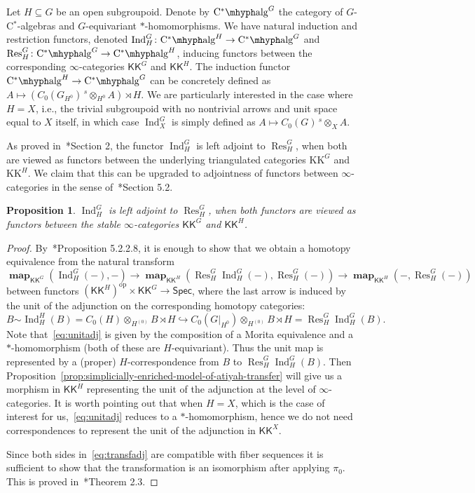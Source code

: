 \documentclass[a4paper,reqno]{amsart}
\theoremstyle{plain}
\newtheorem{proposition}[theorem]{Proposition}
\theoremstyle{definition}
\theoremstyle{remark}
\numberwithin{equation}{section}
\newcommand{\Spec}{\mathsf{Spec}}
\newcommand{\CstAlg}{\mathrm{C}^*\mhyph\mathrm{alg}}
\newcommand{\KK}{\mathrm{KK}}
\newcommand{\icKK}{\mathsf{KK}}
\DeclareMathOperator{\Ind}{Ind}
\DeclareMathOperator{\Res}{Res}
\DeclareMathOperator{\map}{\mathbf{map}}
\begin{document}
Let $H\subseteq G$ be an open subgroupoid. Denote by $\CstAlg^G$ the category of $G$-C$^*$-algebras and $G$-equivariant $\ast$-homomorphisms. We have natural induction and restriction functors, denoted $\Ind_H^G\colon \CstAlg^H\to \CstAlg^G$ and $\Res^G_H\colon \CstAlg^G\to \CstAlg^H$, inducing functors between the corresponding $\infty$-categories $\icKK^G$ and $\icKK^H$. The induction functor $\CstAlg^H\to \CstAlg^G$ can be concretely defined as $A\mapsto (C_0(G_{H^{0}})\,^{s}\!\otimes_{H^{0}} A)\rtimes H$. We are particularly interested in the case where $H=X$, i.e., the trivial subgroupoid with no nontrivial arrows and unit space equal to $X$ itself, in which case $\Ind_X^G$ is simply defined as $A\mapsto C_0(G)\,^{s}\!\otimes_X A$.

As proved in~\cite{val:kthpgrp}*{Section 2}, the functor $\Ind_H^G$ is left adjoint to $\Res^G_H$, when both are viewed as functors between the underlying triangulated categories $\KK^G$ and $\KK^H$.
We claim that this can be upgraded to adjointness of functors between $\infty$-categories in the sense of~\cite{lur:ht}*{Section 5.2}.

\begin{proposition}\label{prop:adj}
$\Ind_H^G$ is left adjoint to $\Res^G_H$, when both functors are viewed as functors between the stable $\infty$-categories $\icKK^G$ and $\icKK^H$.
\end{proposition}

\begin{proof}
By~\cite{lur:ht}*{Proposition 5.2.2.8}, it is enough to show that we obtain a homotopy equivalence from the natural transform
\begin{equation}\label{eq:transfadj}
\map_{\icKK^G}(\Ind_H^G(-),-)\to \map_{\icKK^H}(\Res^G_H\Ind_H^G(-),\Res^G_H(-))\to \map_{\icKK^H}(-,\Res^G_H(-))
\end{equation}
between functors $(\icKK^H)^{\mathrm{op}}\times \icKK^G\to \Spec$, where the last arrow is induced by the unit of the adjunction on the corresponding homotopy categories:
\begin{equation}\label{eq:unitadj}
B \sim_{} \Ind_H^H(B)= C_0(H)\otimes_{H^{(0)}} B\rtimes H \hookrightarrow C_0(G|_{H^{0}})\otimes_{H^{(0)}} B\rtimes H= \Res^G_H\Ind_H^G(B).
\end{equation}
Note that~\eqref{eq:unitadj} is given by the composition of a Morita equivalence and a $\ast$-homomorphism (both of these are $H$-equivariant). Thus the unit map is represented by a (proper) $H$-correspondence from $B$ to $\Res^G_H\Ind_H^G(B)$. Then Proposition~\ref{prop:simplicially-enriched-model-of-atiyah-transfer} will give us a morphism in $\icKK^H$ representing the unit of the adjunction at the level of $\infty$-categories. It is worth pointing out that when $H=X$, which is the case of interest for us,~\eqref{eq:unitadj} reduces to a $\ast$-homomorphism, hence we do not need correspondences to represent the unit of the adjunction in $\icKK^X$.

Since both sides in~\eqref{eq:transfadj} are compatible with fiber sequences it is sufficient to show that the transformation is an isomorphism after applying $\pi_0$. This is proved in~\cite{val:kthpgrp}*{Theorem 2.3}.
\end{proof}
\end{document}
